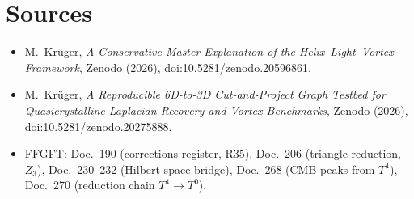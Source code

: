 \section{Sources}

\begin{itemize}
\item M.~Krüger, \emph{A Conservative Master Explanation of the Helix--Light--Vortex Framework},
Zenodo (2026), doi:10.5281/zenodo.20596861.
\item M.~Krüger, \emph{A Reproducible 6D-to-3D Cut-and-Project Graph Testbed for Quasicrystalline
Laplacian Recovery and Vortex Benchmarks}, Zenodo (2026), doi:10.5281/zenodo.20275888.
\item FFGFT: Doc.~190 (corrections register, R35), Doc.~206 (triangle reduction, $Z_3$), Doc.~230--232
(Hilbert-space bridge), Doc.~268 (CMB peaks from $T^4$), Doc.~270 (reduction chain $T^4\!\to\!T^0$).
\end{itemize}
